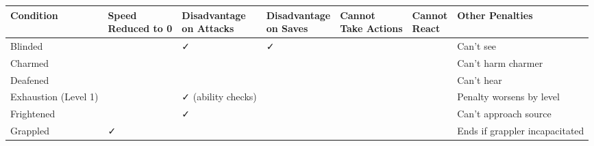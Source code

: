 \documentclass[letterpaper,landscape]{article}
\begin{document}
\renewcommand{\arraystretch}{1.5}
\setlength{\tabcolsep}{5pt}

\begin{table}[h!]
\centering
\begin{tabular}{@{}l>{\centering}p{3cm}>{\centering}p{3cm}>{\centering}p{3cm}>{\centering}p{3cm}>{\centering}p{3cm}p{6cm}@{}}
\toprule
\textbf{Condition} & \parbox{3cm}{\centering Speed \\ Reduced to 0} & \parbox{3cm}{\centering Disadvantage \\ on Attacks} & \parbox{3cm}{\centering Disadvantage \\ on Saves} & \parbox{3cm}{\centering Cannot \\ Take Actions} & \parbox{3cm}{\centering Cannot \\ React} & \textbf{Other Penalties} \\ \midrule
Blinded            &                                              & \centering ✓                                  & \centering ✓                                 &                                        &                                     & Can't see \\ 
Charmed            &                                              &                                              &                                             &                                        &                                     & Can't harm charmer \\ 
Deafened           &                                              &                                              &                                             &                                        &                                     & Can't hear \\ 
Exhaustion (Level 1) &                                            & ✓ (ability checks)                           &                                             &                                        &                                     & Penalty worsens by level \\ 
Frightened         &                                              & \centering ✓                                  &                                             &                                        &                                     & Can't approach source \\ 
Grappled           & \centering ✓                                &                                              &                                             &                                        &                                     & Ends if grappler incapacitated \\ 

\end{tabular}
\end{table}
\end{document}
